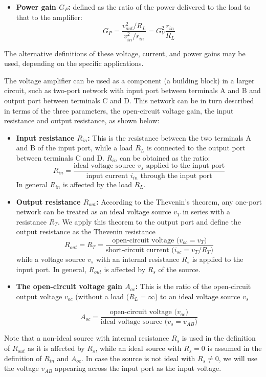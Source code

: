 \begin{itemize}
\begin{itemize}
\item {\bf Power gain $G_P$: } defined as the ratio of the power delivered to the
load to that to the amplifier:
\[ G_P=\frac{v_{out}^2/R_L}{v_{in}^2/r_{in}}=G_V^2 \frac{r_{in}}{R_L} \]
\end{itemize}

The alternative definitions of these voltage, current, and power gains may be
used, depending on the specific applications.

The voltage amplifier can be used as a component (a building block) in a 
larger circuit, such as two-port network with input port between terminals 
A and B and output port between terminals C and D. This network can be in turn 
described in terms of the three parameters, the open-circuit voltage gain,
the input resistance and output resistance, as shown below:
\begin{itemize}
\item {\bf Input resistance $R_{in}$:} This is the resistance between the two 
  terminals A and B of the input port, while a load $R_L$ is connected to the 
  output port between terminals C and D. $R_{in}$ can be obtained as the ratio:
  \[ R_{in}=\frac{\mbox{ideal voltage source $v_s$ applied to the input port}}{\mbox{input current $i_{in}$ through the input port}} \]
  In general $R_{in}$ is affected by the load $R_L$.
\item {\bf Output resistance $R_{out}$:} According to the Thevenin's theorem, 
  any one-port network can be treated as an ideal voltage source $v_T$ in series 
  with a resistance $R_T$. We apply this theorem to the output port and define
  the output resistance as the Thevenin resistance 
  \[ R_{out}=R_T=\frac{\mbox{open-circuit voltage ($v_{oc}=v_T$)}}{\mbox{short-circuit current ($i_{sc}=v_T/R_T$)}} \]
  while a voltage source $v_s$ with an internal resistance $R_s$ is applied 
  to the input port. In general, $R_{out}$ is affected by $R_s$ of the source.
\item {\bf The open-circuit voltage gain $A_{oc}$:} This is the ratio of the 
  open-circuit output voltage $v_{oc}$ (without a load ($R_L=\infty$) to an 
  ideal voltage source $v_s$ 
  
  \[ A_{oc}=\frac{\mbox{open-circuit voltage ($v_{oc}$)}}{\mbox{ideal voltage source ($v_s=v_{AB}$)}}\]
\end{itemize}
Note that a non-ideal source with internal resistance $R_s$ is used in the definition
of $R_{out}$ as it is affected by $R_s$, while an ideal source with $R_s=0$ is 
assumed in the definition of $R_{in}$ and $A_{oc}$. In case the source is not
ideal with $R_s\ne 0$, we will use the voltage $v_{AB}$ appearing across the input
port as the input voltage.


\end{itemize}
